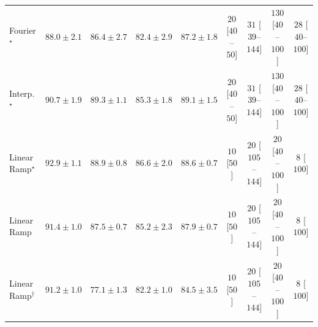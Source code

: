 \begin{tabular}{l|cccc|cccc|}
Fourier$^\star$ & {\cellcolor[HTML]{006837}} \color[HTML]{F1F1F1} $88.0\pm 2.1$ & {\cellcolor[HTML]{0B713B}} \color[HTML]{F1F1F1} $86.4\pm 2.7$ & {\cellcolor[HTML]{258745}} \color[HTML]{F1F1F1} $82.4\pm 2.9$ & {\cellcolor[HTML]{066D39}} \color[HTML]{F1F1F1} $87.2\pm 1.8$ & {\cellcolor[HTML]{FFF4F0}} \color[HTML]{000000} $20$ [$40$--$50$] & {\cellcolor[HTML]{FFF2EE}} \color[HTML]{000000} $31$ [$39$--$144$] & {\cellcolor[HTML]{FDDBD7}} \color[HTML]{000000} $130$ [$40$--$100$] & {\cellcolor[HTML]{FFF3EF}} \color[HTML]{000000} $28$ [$40$--$100$] \\
Interp.$^\star$ & {\cellcolor[HTML]{005730}} \color[HTML]{F1F1F1} $90.7\pm 1.9$ & {\cellcolor[HTML]{005F34}} \color[HTML]{F1F1F1} $89.3\pm 1.1$ & {\cellcolor[HTML]{12763D}} \color[HTML]{F1F1F1} $85.3\pm 1.8$ & {\cellcolor[HTML]{006034}} \color[HTML]{F1F1F1} $89.1\pm 1.5$ & {\cellcolor[HTML]{FFF4F0}} \color[HTML]{000000} $20$ [$40$--$50$] & {\cellcolor[HTML]{FFF2EE}} \color[HTML]{000000} $31$ [$39$--$144$] & {\cellcolor[HTML]{FDDBD7}} \color[HTML]{000000} $130$ [$40$--$100$] & {\cellcolor[HTML]{FFF3EF}} \color[HTML]{000000} $28$ [$40$--$100$] \\
Linear Ramp$^\star$ & {\cellcolor[HTML]{00482A}} \color[HTML]{F1F1F1} $92.9\pm 1.1$ & {\cellcolor[HTML]{006335}} \color[HTML]{F1F1F1} $88.9\pm 0.8$ & {\cellcolor[HTML]{0A703A}} \color[HTML]{F1F1F1} $86.6\pm 2.0$ & {\cellcolor[HTML]{006435}} \color[HTML]{F1F1F1} $88.6\pm 0.7$ & {\cellcolor[HTML]{FFF7F3}} \color[HTML]{000000} $10$ [$50$] & {\cellcolor[HTML]{FFF4F0}} \color[HTML]{000000} $20$ [$105$--$144$] & {\cellcolor[HTML]{FFF4F0}} \color[HTML]{000000} $20$ [$40$--$100$] & {\cellcolor[HTML]{FFF7F3}} \color[HTML]{000000} $8$ [$100$] \\
Linear Ramp & {\cellcolor[HTML]{00522E}} \color[HTML]{F1F1F1} $91.4\pm 1.0$ & {\cellcolor[HTML]{036B38}} \color[HTML]{F1F1F1} $87.5\pm 0.7$ & {\cellcolor[HTML]{13773D}} \color[HTML]{F1F1F1} $85.2\pm 2.3$ & {\cellcolor[HTML]{016937}} \color[HTML]{F1F1F1} $87.9\pm 0.7$ & {\cellcolor[HTML]{FFF7F3}} \color[HTML]{000000} $10$ [$50$] & {\cellcolor[HTML]{FFF4F0}} \color[HTML]{000000} $20$ [$105$--$144$] & {\cellcolor[HTML]{FFF4F0}} \color[HTML]{000000} $20$ [$40$--$100$] & {\cellcolor[HTML]{FFF7F3}} \color[HTML]{000000} $8$ [$100$] \\
Linear Ramp$^\dagger$ & {\cellcolor[HTML]{00532F}} \color[HTML]{F1F1F1} $91.2\pm 1.0$ & {\cellcolor[HTML]{45AD5F}} \color[HTML]{F1F1F1} $77.1\pm 1.3$ & {\cellcolor[HTML]{268846}} \color[HTML]{F1F1F1} $82.2\pm 1.0$ & {\cellcolor[HTML]{177B3F}} \color[HTML]{F1F1F1} $84.5\pm 3.5$ & {\cellcolor[HTML]{FFF7F3}} \color[HTML]{000000} $10$ [$50$] & {\cellcolor[HTML]{FFF4F0}} \color[HTML]{000000} $20$ [$105$--$144$] & {\cellcolor[HTML]{FFF4F0}} \color[HTML]{000000} $20$ [$40$--$100$] & {\cellcolor[HTML]{FFF7F3}} \color[HTML]{000000} $8$ [$100$] \\

\end{tabular}
